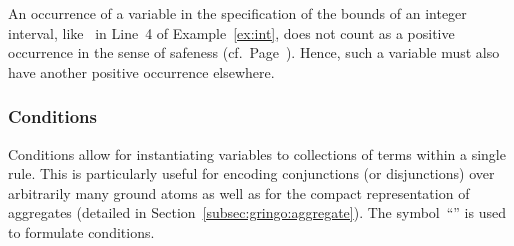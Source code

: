 \begin{Note}
An occurrence of a variable in the specification of the bounds
of an integer interval, like~ in Line~4 of Example~\ref{ex:int}, 
does not count as a positive occurrence
in the sense of safeness (cf.\ Page~\pageref{pg:safe}).
Hence, such a variable must also have another positive occurrence elsewhere.
%
\end{Note}

\subsubsection{Conditions}\label{subsec:gringo:condition}


Conditions allow for instantiating variables to
collections of terms within a single rule.
This is particularly useful for encoding conjunctions (or disjunctions) over
arbitrarily many ground atoms as well as for the compact representation of aggregates
(detailed in Section~\ref{subsec:gringo:aggregate}).
The symbol~``\code{:}'' is used to formulate conditions.

